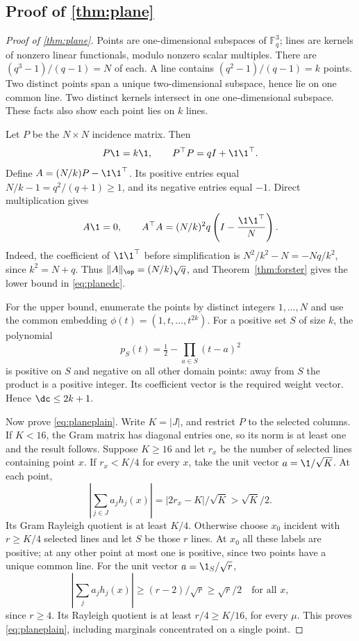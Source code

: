 \subsection[Proof of result plane]{Proof of \cref{thm:plane}}\label{proof:plane}
\begin{proof}[Proof of \cref{thm:plane}]
Points are one-dimensional subspaces of $\mathbb F_q^3$; lines are kernels of nonzero linear functionals, modulo nonzero scalar multiples. There are $(q^3-1)/(q-1)=N$ of each. A line contains $(q^2-1)/(q-1)=k$ points. Two distinct points span a unique two-dimensional subspace, hence lie on one common line. Two distinct kernels intersect in one one-dimensional subspace. These facts also show each point lies on $k$ lines.

Let $P$ be the $N\times N$ incidence matrix. Then
\[
 P\1=k\1,\qquad P^\top P=qI+\1\1^\top.
\]
Define $A=(N/k)P-\1\1^\top$. Its positive entries equal $N/k-1=q^2/(q+1)\geq1$, and its negative entries equal $-1$. Direct multiplication gives
\[
 A\1=0,\qquad
 A^\top A=(N/k)^2q\left(I-\frac{\1\1^\top}{N}\right).
\]
Indeed, the coefficient of $\1\1^\top$ before simplification is $N^2/k^2-N=-Nq/k^2$, since $k^2=N+q$. Thus $\|A\|_\op=(N/k)\sqrt q$, and Theorem~\ref{thm:forster} gives the lower bound in \eqref{eq:planedc}.

For the upper bound, enumerate the points by distinct integers $1,\ldots,N$ and use the common embedding
$\phi(t)=(1,t,\ldots,t^{2k})$. For a positive set $S$ of size $k$, the polynomial
\[
 p_S(t)=\tfrac12-\prod_{a\in S}(t-a)^2
\]
is positive on $S$ and negative on all other domain points: away from $S$ the product is a positive integer. Its coefficient vector is the required weight vector. Hence $\dc\leq2k+1$.

Now prove \eqref{eq:planeplain}. Write $K=|J|$, and restrict $P$ to the selected columns. If $K<16$, the Gram matrix has diagonal entries one, so its norm is at least one and the result follows. Suppose $K\geq16$ and let $r_x$ be the number of selected lines containing point $x$.
If $r_x<K/4$ for every $x$, take the unit vector $a=\1/\sqrt K$. At each point,
\[
 |\textstyle\sum_{j\in J}a_jh_j(x)|=|2r_x-K|/\sqrt K>\sqrt K/2.
\]
Its Gram Rayleigh quotient is at least $K/4$. Otherwise choose $x_0$ incident with $r\geq K/4$ selected lines and let $S$ be those $r$ lines. At $x_0$ all these labels are positive; at any other point at most one is positive, since two points have a unique common line. For the unit vector $a=\1_S/\sqrt r$,
\[
 |\textstyle\sum_j a_jh_j(x)|\geq(r-2)/\sqrt r\geq\sqrt r/2
 \quad\text{for all }x,
\]
since $r\geq4$. Its Rayleigh quotient is at least $r/4\geq K/16$, for every $\mu$. This proves \eqref{eq:planeplain}, including marginals concentrated on a single point.


\end{proof}
